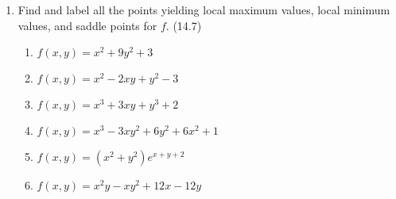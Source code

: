 \begin{enumerate}
    \newpage

    \item Find and label all the points yielding local maximum values, local minimum values, and saddle points for $f$. (14.7)

      \begin{enumerate}
        \item $f(x,y)=x^2+9y^2+3$
        \item $f(x,y)=x^2-2xy+y^2-3$
        \item $f(x,y)=x^3+3xy+y^3+2$
        \item $f(x,y)=x^3-3xy^2+6y^2+6x^2+1$
        \item $f(x,y)=(x^2+y^2)e^{x+y+2}$
        \item $f(x,y)=x^2y-xy^2+12x-12y$
      \end{enumerate}

    \end{enumerate}



